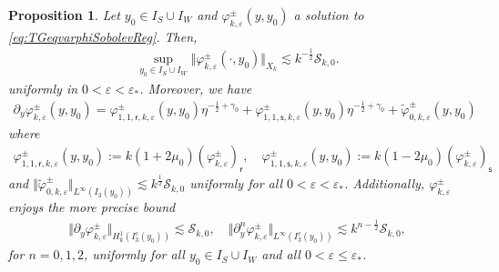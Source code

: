 \documentclass[11pt,reqno]{amsproc}
\newtheorem{proposition}{Proposition}[section]
\theoremstyle{definition}
\numberwithin{equation}{section}
\newcommand{\sr}{{\mathsf{r}}}
\newcommand{\s}{{\mathsf{s}}}
\newcommand{\cS}{{\mathcal S}}
\newcommand{\ep}{\varepsilon}
\begin{document}
\begin{proposition}\label{prop:Xkvarphi}
Let $y_0\in I_S\cup I_W$ and ${\varphi}_{k,\ep}^\pm(y,y_0)$ a solution to \eqref{eq:TGeqvarphiSobolevReg}. Then,
\begin{align*}
\sup_{y_0\in I_S\cup I_W}\Vert {\varphi}_{k,\ep}^\pm(\cdot,y_0) \Vert_{X_k}\lesssim k^{-\frac12}\cS_{k,0}.
\end{align*}
uniformly in $0< \ep< \ep_*$. Moreover, we have
\begin{align}\label{eq:decomXkpyvarphi}
\partial_y\varphi_{k,\ep}^\pm(y,y_0) =  \varphi_{1,1,\sr,k,\ep}^\pm(y,y_0) \eta^{-\frac12+\gamma_0} + \varphi_{1,1,\s,k,\ep}^\pm(y,y_0) \eta^{-\frac12+\gamma_0} + \widetilde\varphi_{0,k,\ep}^\pm(y,y_0) 
\end{align}
where
\begin{align*}
\varphi_{1,1,\sr,k,\ep}^\pm (y,y_0) := k(1+2\mu_0)\left( \varphi_{k,\ep}^\pm \right)_\sr, \quad \varphi_{1,1,\s,k,\ep}^\pm (y,y_0) := k(1-2\mu_0)\left( \varphi_{k,\ep}^\pm \right)_\s
\end{align*}
and $\Vert \widetilde\varphi_{0,k,\ep}^\pm \Vert_{L^\infty(I_3(y_0))} \lesssim k^{\frac12}\cS_{k,0}$ uniformly for all $0< \ep< \ep_*$. Additionally, $\varphi_{k,\ep}^\pm$ enjoys the more precise bound
\begin{align*}
\Vert \partial_{y}\varphi_{k,\ep}^\pm \Vert_{H_k^1(I_3^c(y_0))} \lesssim  \cS_{k,0}, \quad \Vert \partial_y^n\varphi_{k,\ep}^\pm \Vert_{L^{\infty}(I_3^c(y_0))} \lesssim k^{n-\frac12}\cS_{k,0}, 
\end{align*}
for $n=0,1,2$, uniformly for all $y_0\in I_S\cup I_{W}$ and all $0 < \ep\leq \ep_*$.
\end{proposition}
\end{document}
